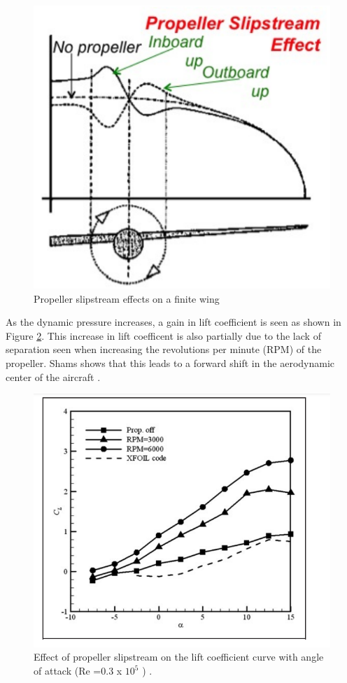 \begin{figure}[H]
  \centering
  \includegraphics[width=0.4\linewidth]{03_LiteratureReview/Figs/slipstream.png}
  \caption{ Propeller slipstream effects on a finite wing \cite{Ferraro2014}}
  \label{fig:overallProp}
\end{figure}

As the dynamic pressure increases, a gain in lift coefficient is seen as shown in Figure \ref{fig:propanswer}. This increase in lift coefficent is also partially due to the lack of separation seen when increasing the revolutions per minute (RPM) of the propeller. Shams shows that this leads to a forward shift in the aerodynamic center of the aircraft \cite{Shams2020} \cite{Shams2020b}.


\begin{figure}[H]
  \centering
  \includegraphics[width=0.8\linewidth]{03_LiteratureReview/Figs/Cl.png}
  \caption{ Effect of propeller slipstream on the lift coefficient
curve with angle of attack (Re =0.3 x $10^5$
) \cite{Aminaei2019}.}
  \label{fig:propanswer}
\end{figure}


